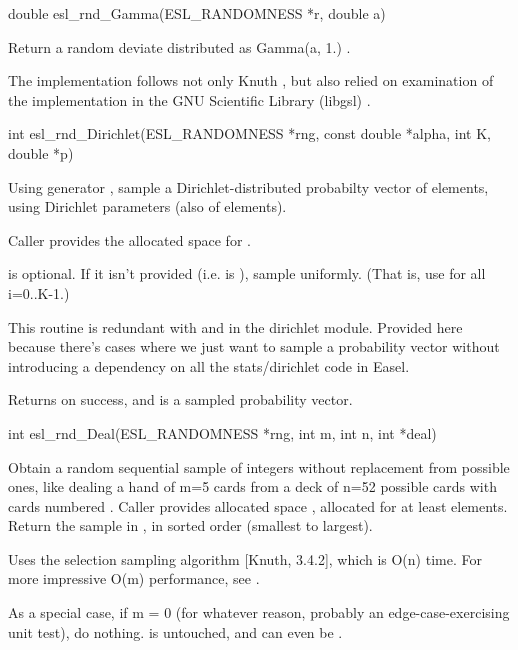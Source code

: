 \begin{sreapi}
\hypertarget{func:esl_rnd_Gamma()}
{\item[double esl\_rnd\_Gamma(ESL\_RANDOMNESS *r, double a)]}

Return a random deviate distributed as Gamma(a, 1.)
\citep[pp. 133--134]{Knu-81a}.

The implementation follows not only Knuth \citep{Knu-81a},
but also relied on examination of the implementation in
the GNU Scientific Library (libgsl) \citep{Galassi06}.



\hypertarget{func:esl_rnd_Dirichlet()}
{\item[int esl\_rnd\_Dirichlet(ESL\_RANDOMNESS *rng, const double *alpha, int K, double *p)]}

Using generator , sample a Dirichlet-distributed
probabilty vector  of  elements, using Dirichlet
parameters  (also of  elements). 

Caller provides the allocated space for .

 is optional. If it isn't provided (i.e. is
), sample  uniformly. (That is, use  for all i=0..K-1.)

This routine is redundant with 
and  in the dirichlet
module. Provided here because there's cases where we
just want to sample a probability vector without
introducing a dependency on all the stats/dirichlet code
in Easel.

Returns  on success, and  is a sampled probability vector.


\hypertarget{func:esl_rnd_Deal()}
{\item[int esl\_rnd\_Deal(ESL\_RANDOMNESS *rng, int m, int n, int *deal)]}

Obtain a random sequential sample of  integers without
replacement from  possible ones, like dealing a hand
of m=5 cards from a deck of n=52 possible cards with
cards numbered . Caller provides allocated space
, allocated for at least  elements. Return the
sample in , in sorted order (smallest to largest).

Uses the selection sampling algorithm [Knuth, 3.4.2],
which is O(n) time. For more impressive O(m)
performance, see .

As a special case, if m = 0 (for whatever reason,
probably an edge-case-exercising unit test), do
nothing.  is untouched, and can even be .


\end{sreapi}

